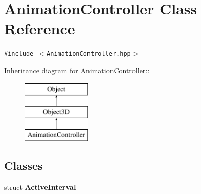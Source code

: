 \hypertarget{classm3g_1_1AnimationController}{
\section{AnimationController Class Reference}
\label{classm3g_1_1AnimationController}
}
{\tt \#include $<$AnimationController.hpp$>$}

Inheritance diagram for AnimationController::\begin{figure}[H]
\begin{center}
\leavevmode
\includegraphics[height=3cm]{classm3g_1_1AnimationController}
\end{center}
\end{figure}
\subsection*{Classes}
\begin{CompactItemize}
\item 
struct \textbf{ActiveInterval}
\end{CompactItemize}
